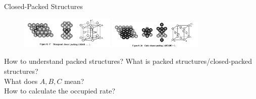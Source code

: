 \documentclass[12pt,compress]{beamer}
\begin{document}
\begin{frame}{Closed-Packed Structures}
	\begin{figure}[!htbp]
		\begin{minipage}{14cm}
			\includegraphics[width=0.4\textwidth]{hcp.png}
			\includegraphics[width=0.4\textwidth]{ccp.png}
		\end{minipage}
	\end{figure}
	\begin{block}{How to understand packed structures?}
		What is packed structures/closed-packed structures? \\ 
		What does $A,B,C$ mean? \\ 
		How to calculate the occupied rate?
	\end{block}
\end{frame}
\end{document}
